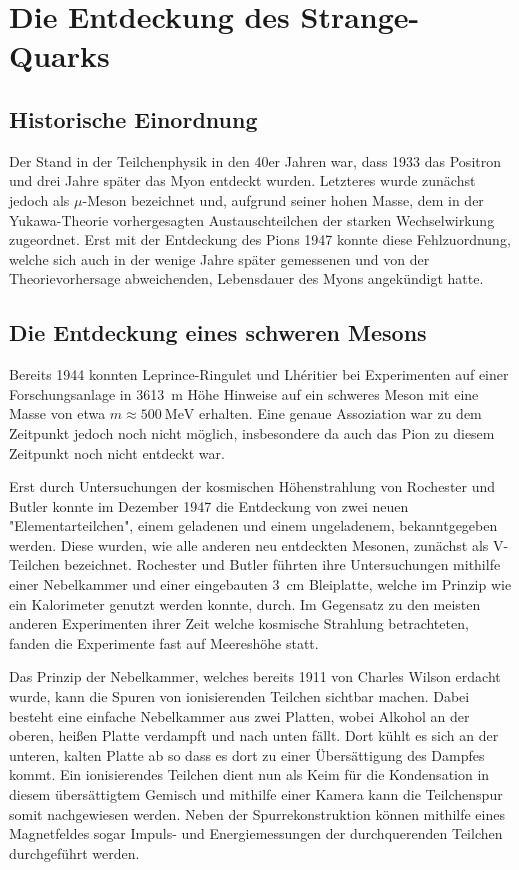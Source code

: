 
\section{Die Entdeckung des Strange-Quarks}


\subsection{Historische Einordnung}

Der Stand in der Teilchenphysik in den 40er Jahren war, dass 1933 das Positron und drei Jahre später das Myon entdeckt wurden.
Letzteres wurde zunächst jedoch als $\mu$-Meson bezeichnet und, aufgrund seiner hohen Masse, dem in der Yukawa-Theorie vorhergesagten Austauschteilchen der starken Wechselwirkung zugeordnet.
Erst mit der Entdeckung des Pions 1947 konnte diese Fehlzuordnung, welche sich auch in der wenige Jahre später gemessenen und von der Theorievorhersage abweichenden, Lebensdauer des Myons angekündigt hatte.

\subsection{Die Entdeckung eines schweren Mesons}

Bereits 1944 konnten Leprince-Ringulet und Lhéritier bei Experimenten auf einer Forschungsanlage in \SI{3613}{\metre} Höhe Hinweise auf ein schweres Meson mit eine Masse von etwa $m \approx \SI{500}{\mega\electronvolt}$ erhalten.
Eine genaue Assoziation war zu dem Zeitpunkt jedoch noch nicht möglich, insbesondere da auch das Pion zu diesem Zeitpunkt noch nicht entdeckt war.

Erst durch Untersuchungen der kosmischen Höhenstrahlung von Rochester und Butler konnte im Dezember 1947 die Entdeckung von zwei neuen "Elementarteilchen", einem geladenen und einem ungeladenem, bekanntgegeben werden.
Diese wurden, wie alle anderen neu entdeckten Mesonen, zunächst als V-Teilchen bezeichnet.
Rochester und Butler führten ihre Untersuchungen mithilfe einer Nebelkammer und einer eingebauten \SI{3}{\centi\metre} Bleiplatte, welche im Prinzip wie ein Kalorimeter genutzt werden konnte, durch. 
Im Gegensatz zu den meisten anderen Experimenten ihrer Zeit welche kosmische Strahlung betrachteten, fanden die Experimente fast auf Meereshöhe statt.

Das Prinzip der Nebelkammer, welches bereits 1911 von Charles Wilson erdacht wurde, kann die Spuren von ionisierenden Teilchen sichtbar machen.
Dabei besteht eine einfache Nebelkammer aus zwei Platten, wobei Alkohol an der oberen, heißen Platte verdampft und nach unten fällt.
Dort kühlt es sich an der unteren, kalten Platte ab so dass es dort zu einer Übersättigung des Dampfes kommt.
Ein ionisierendes Teilchen dient nun als Keim für die Kondensation in diesem übersättigtem Gemisch und mithilfe einer Kamera kann die Teilchenspur somit nachgewiesen werden.
Neben der Spurrekonstruktion können mithilfe eines Magnetfeldes sogar Impuls- und Energiemessungen der durchquerenden Teilchen durchgeführt werden.

